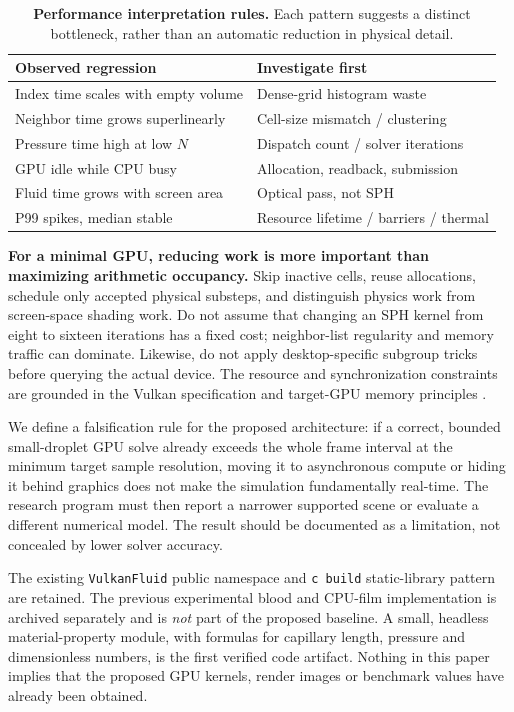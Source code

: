 \documentclass[10pt,a4paper]{article}
\makeatletter
\renewcommand{\section}{\@startsection{section}{1}{\z@}{1.35ex plus .5ex minus .1ex}{.7ex}{\normalfont\bfseries\normalsize}}
\makeatother
\begin{document}
\begin{table}[t]
\centering\footnotesize
\caption{\textbf{Performance interpretation rules.} Each pattern suggests a distinct bottleneck, rather than an automatic reduction in physical detail.}
\begin{tabularx}{\columnwidth}{@{}p{}X@{}}
\toprule
Observed regression & Investigate first\\
\midrule
Index time scales with empty volume & Dense-grid histogram waste\\
Neighbor time grows superlinearly & Cell-size mismatch / clustering\\
Pressure time high at low $N$ & Dispatch count / solver iterations\\
GPU idle while CPU busy & Allocation, readback, submission\\
Fluid time grows with screen area & Optical pass, not SPH\\
P99 spikes, median stable & Resource lifetime / barriers / thermal\\
\bottomrule
\end{tabularx}
\label{tab:diagnosis}
\end{table}

\textbf{For a minimal GPU, reducing work is more important than maximizing arithmetic occupancy.} Skip inactive cells, reuse allocations, schedule only accepted physical substeps, and distinguish physics work from screen-space shading work. Do not assume that changing an SPH kernel from eight to sixteen iterations has a fixed cost; neighbor-list regularity and memory traffic can dominate. Likewise, do not apply desktop-specific subgroup tricks before querying the actual device. The resource and synchronization constraints are grounded in the Vulkan specification \citep{vulkanSync} and target-GPU memory principles \citep{appleTile}.

We define a falsification rule for the proposed architecture: if a correct, bounded small-droplet GPU solve already exceeds the whole frame interval at the minimum target sample resolution, moving it to asynchronous compute or hiding it behind graphics does not make the simulation fundamentally real-time. The research program must then report a narrower supported scene or evaluate a different numerical model. The result should be documented as a limitation, not concealed by lower solver accuracy.


\section{Implementation Plan and Scope}
The existing \texttt{VulkanFluid} public namespace and \texttt{c build} static-library pattern are retained. The previous experimental blood and CPU-film implementation is archived separately and is \emph{not} part of the proposed baseline. A small, headless material-property module, with formulas for capillary length, pressure and dimensionless numbers, is the first verified code artifact. Nothing in this paper implies that the proposed GPU kernels, render images or benchmark values have already been obtained.
\end{document}
